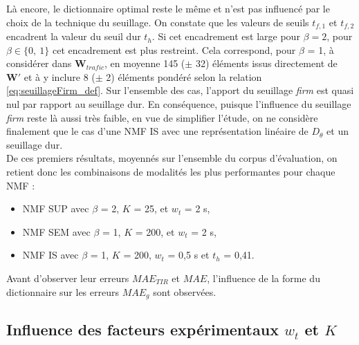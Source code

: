 Là encore, le dictionnaire optimal reste le même et n'est pas influencé par le choix de la technique du seuillage. On constate que les valeurs de seuils $t_{f,1}$ et $t_{f,2}$ encadrent la valeur du seuil dur $t_h$. Si cet encadrement est large pour $\beta = 2$, pour $\beta \in \lbrace 0,~1 \rbrace$ cet encadrement est plus restreint. Cela correspond, pour $\beta$ = 1, à considérer dans $\mathbf{W}_{trafic}$, en moyenne 145 ($\pm$ 32) éléments issus directement de $\mathbf{W'}$ et à y inclure 8 ($\pm$ 2) éléments pondéré selon la relation \ref{eq:seuillageFirm_def}. Sur l'ensemble des cas, l'apport du seuillage \textit{firm} est quasi nul par rapport au seuillage dur. En conséquence, puisque l'influence du seuillage \textit{firm} reste là aussi très faible, en vue de simplifier l'étude, on ne considère finalement que le cas d'une NMF IS avec une représentation linéaire de $D_{\theta}$ et un seuillage dur. \\

De ces premiers résultats, moyennés sur l'ensemble du corpus d'évaluation, on retient donc les combinaisons de modalités les plus performantes pour chaque NMF : 

\begin{itemize}
\item NMF SUP avec $\beta$ = 2, $K$ = 25, et $w_t$ = 2 s, 
\item NMF SEM avec $\beta$ = 1, $K$ = 200, et $w_t$ = 2 s, 
\item NMF IS avec $\beta$ = 1, $K$ = 200, $w_t$ = 0,5 s et $t_h$ = 0,41.\\
\end{itemize}

Avant d'observer leur erreurs $MAE_{TIR}$ et $MAE$, l'influence de la forme du dictionnaire sur les erreurs $MAE_g$ sont observées.

\subsection{Influence des facteurs expérimentaux $w_t$ et $K$}

